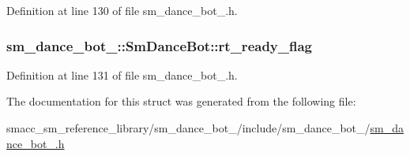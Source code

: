 Definition at line 130 of file sm\+\_\+dance\+\_\+bot\+\_.\+h.

\subsubsection[{\texorpdfstring{rt\+\_\+ready\+\_\+flag}{rt_ready_flag}}]{ sm\+\_\+dance\+\_\+bot\+\_\+::\+Sm\+Dance\+Bot\+::rt\+\_\+ready\+\_\+flag}\hypertarget{structsm__dance__bot__3_1_1SmDanceBot_a3f8e3b6a1b7cb4984e9fe281d84a2ab2}{}\label{structsm__dance__bot__3_1_1SmDanceBot_a3f8e3b6a1b7cb4984e9fe281d84a2ab2}


Definition at line 131 of file sm\+\_\+dance\+\_\+bot\+\_.\+h.



The documentation for this struct was generated from the following file\+:\begin{DoxyCompactItemize}
\item 
smacc\+\_\+sm\+\_\+reference\+\_\+library/sm\+\_\+dance\+\_\+bot\+\_/include/sm\+\_\+dance\+\_\+bot\+\_/\hyperlink{sm__dance__bot__3_8h}{sm\+\_\+dance\+\_\+bot\+\_.\+h}\end{DoxyCompactItemize}
